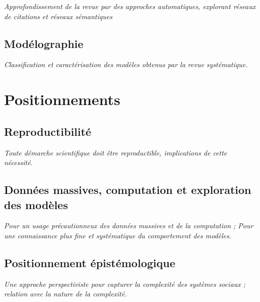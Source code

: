 \textit{Approfondissement de la revue par des approches automatiques, explorant réseaux de citations et réseaux sémantiques}



\subsection{Modélographie}

\textit{Classification et caractérisation des modèles obtenus par la revue systématique.}




\section{Positionnements}


\subsection{Reproductibilité}

\textit{Toute démarche scientifique doit être reproductible, implications de cette nécessité.}


\subsection{Données massives, computation et exploration des modèles}

\textit{Pour un usage précautionneux des données massives et de la computation ; Pour une connaissance plus fine et systématique du comportement des modèles.}



\subsection{Positionnement épistémologique}


\textit{Une approche perspectiviste pour capturer la complexité des systèmes sociaux ; relation avec la nature de la complexité.}















